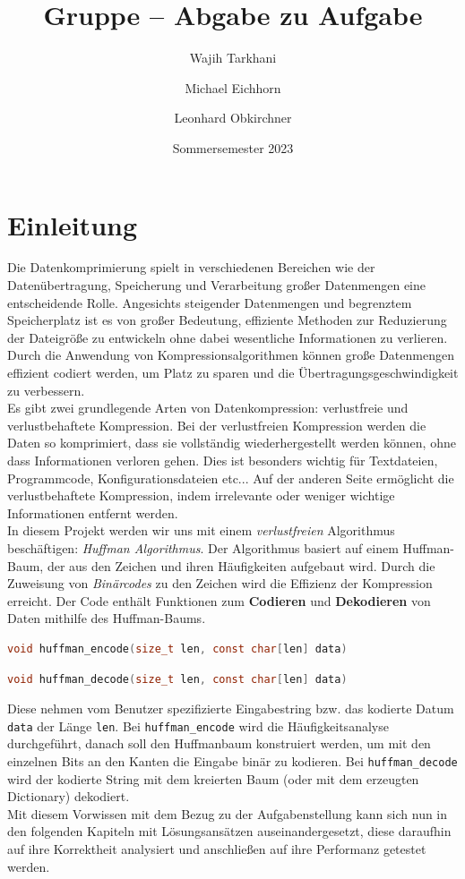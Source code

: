 \documentclass[course=erap]{aspdoc}
\author{Wajih Tarkhani \and Michael Eichhorn \and Leonhard Obkirchner}
\date{Sommersemester 2023} %
\title{Gruppe \theGroup{} -- Abgabe zu Aufgabe \theNumber}
\begin{document}
\maketitle

\section{Einleitung}
Die Datenkomprimierung spielt in verschiedenen Bereichen wie der Datenübertragung, Speicherung und Verarbeitung großer Datenmengen eine entscheidende Rolle. Angesichts steigender Datenmengen und begrenztem Speicherplatz ist es von großer Bedeutung, effiziente Methoden zur Reduzierung der Dateigröße zu entwickeln ohne dabei wesentliche Informationen zu verlieren. Durch die Anwendung von Kompressionsalgorithmen können große Datenmengen effizient codiert werden, um Platz zu sparen und die Übertragungsgeschwindigkeit zu verbessern. \\
Es gibt zwei grundlegende Arten von Datenkompression: verlustfreie und verlustbehaftete Kompression. Bei der verlustfreien Kompression werden die Daten so komprimiert, dass sie vollständig wiederhergestellt werden können, ohne dass Informationen verloren gehen. Dies ist besonders wichtig für Textdateien, Programmcode, Konfigurationsdateien etc...
Auf der anderen Seite ermöglicht die verlustbehaftete Kompression, indem irrelevante oder weniger wichtige Informationen entfernt werden.\\
\newline 
In diesem Projekt werden wir uns mit einem \emph{verlustfreien} Algorithmus beschäftigen: \emph{Huffman Algorithmus}.
Der Algorithmus basiert auf einem Huffman-Baum, der aus den Zeichen und ihren Häufigkeiten aufgebaut wird. Durch die Zuweisung von \emph{Binärcodes} zu den Zeichen wird die Effizienz der Kompression erreicht. Der Code enthält Funktionen zum \textbf{Codieren}
und \textbf{Dekodieren} von Daten mithilfe des Huffman-Baums. \\


\begin{lstlisting}[language=c, numbers=none, frame=none]
void huffman_encode(size_t len, const char[len] data)
\end{lstlisting}

\begin{lstlisting}[language=c, numbers=none, frame=none]
void huffman_decode(size_t len, const char[len] data)
\end{lstlisting}
Diese nehmen vom Benutzer spezifizierte Eingabestring bzw. das kodierte Datum \verb+data+ der Länge \verb+len+. Bei \verb+huffman_encode+ wird die Häufigkeitsanalyse durchgeführt, danach soll den Huffmanbaum konstruiert werden, um mit den einzelnen Bits an den Kanten die Eingabe binär zu kodieren. Bei \verb+huffman_decode+
wird der kodierte String mit dem kreierten Baum (oder mit dem erzeugten Dictionary) dekodiert.\\
\newline
Mit diesem Vorwissen mit dem Bezug zu der Aufgabenstellung kann sich nun in den folgenden Kapiteln mit Lösungsansätzen auseinandergesetzt, diese daraufhin auf ihre Korrektheit analysiert und anschließen auf ihre Performanz getestet werden. \\
\end{document}
